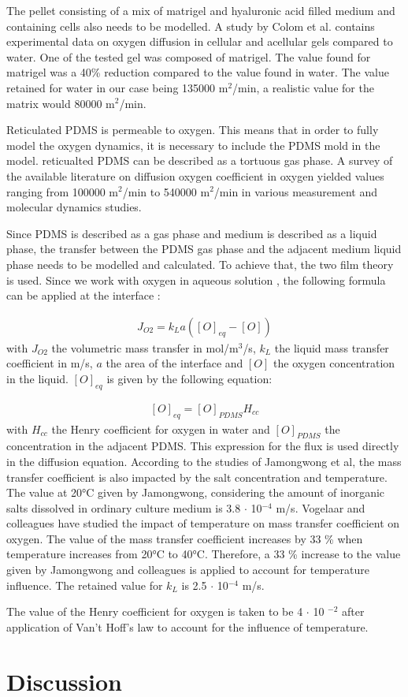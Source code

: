 \documentclass[11pt,a4paper]{article}
\begin{document}
The pellet consisting of a mix of matrigel and hyaluronic acid filled medium and containing cells also needs to be modelled. A study by Colom et al. contains experimental data on oxygen diffusion in cellular and acellular gels compared to water.\cite{Colom2014} One of the tested gel was composed of matrigel. The value found for matrigel was a 40\% reduction compared to the value found in water. The value retained for water in our case being 135000 \textmu m$^2$/min, a realistic value for the matrix would 80000 \textmu m$^2$/min.

Reticulated PDMS is permeable to oxygen. This means that in order to fully model the oxygen dynamics, it is necessary to include the PDMS mold in the model. reticualted PDMS can be described as a tortuous gas phase. A survey of the available literature on diffusion oxygen coefficient in oxygen yielded values ranging from 100000 \textmu m$^2$/min to 540000 \textmu m$^2$/min in various measurement and molecular dynamics studies.\cite{Ullal2014}\cite{Sudibjo2011}\cite{Park2006}\cite{Ziomek1991}\cite{KimM2013}

Since PDMS is described as a gas phase and medium is described as a liquid phase, the transfer between the PDMS gas phase and the adjacent medium liquid phase needs to be modelled and calculated. To achieve that, the two film theory is used.\cite{Doran2012} Since we work with oxygen in aqueous solution , the following formula can be applied at the interface :

\begin{align}
\label{eqn:2FT} J_{O2} =  k_L a([O]_{eq}-[O]) 
\end{align}
with $J_{O2}$ the volumetric mass transfer in mol/m$^3$/s, $k_L$ the liquid mass transfer coefficient in m/s, $a$ the area of the interface and $[O]$ the oxygen concentration in the liquid. $[O]_{eq}$ is given by the following equation:

\begin{align}
\label{eqn:HO} [O]_{eq} =  [O]_{PDMS}H_{cc} 
\end{align}
with $H_{cc}$ the Henry coefficient for oxygen in water and $[O]_{PDMS}$ the concentration in the adjacent PDMS. This expression for the flux is used directly in the diffusion equation. According to the studies of Jamongwong et al, the mass transfer coefficient is also impacted by the salt concentration and temperature. The value at 20°C given by Jamongwong, considering the amount of inorganic salts dissolved in ordinary culture medium is 3.8 $\cdot$ 10$^{-4}$ m/s. Vogelaar and colleagues have studied the impact of temperature on mass transfer coefficient on oxygen.\cite{Vogelaar2000} The value of the mass transfer coefficient increases by 33 \% when temperature increases from 20°C to 40°C. Therefore, a 33 \% increase to the value given by Jamongwong and colleagues is applied to account for temperature influence. The retained value for $k_L$ is 2.5 $\cdot$ 10$^{-4}$ m/s. 

The value of the Henry coefficient for oxygen is taken to be 4 $\cdot$ 10 $^{-2}$ after application of Van't Hoff's law to account for the influence of temperature.



\section{Discussion}



\end{document}
